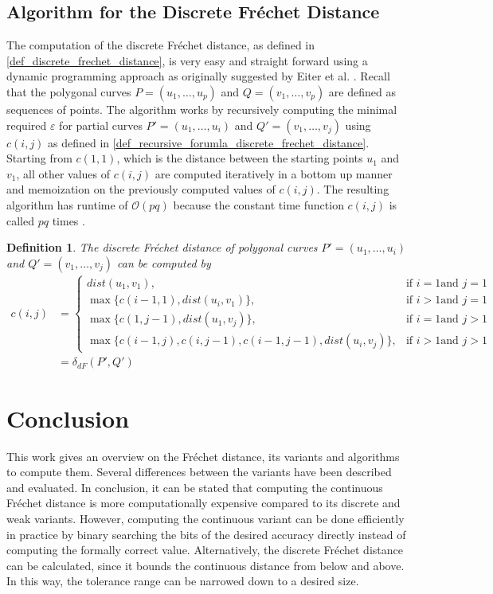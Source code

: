 \documentclass[
oneside,
fontsize=11pt
]{scrartcl}
\newtheorem{mydef}{Definition}
\begin{document}
\subsection{Algorithm for the Discrete Fréchet Distance}
\label{sec_discrete_algorithm}
The computation of the discrete Fréchet distance, as defined in \autoref{def_discrete_frechet_distance}, is very easy and straight forward 
using a dynamic programming approach as originally suggested by Eiter et al. \cite{eiter_computing_1994}.
Recall that the polygonal curves $P = (u_1, \dots, u_p)$ and $Q = (v_1, \dots, v_p)$ are defined as sequences of points.
The algorithm works by recursively computing the minimal required $\varepsilon$ for partial curves 
$P' = (u_1, \dots, u_i)$ and $Q' = (v_1, \dots, v_j)$
using $c(i,j)$ as defined in \autoref{def_recursive_forumla_discrete_frechet_distance}.
Starting from $c(1,1)$, which is the distance between the starting points $u_1$ and $v_1$,
all other values of $c(i,j)$ are computed iteratively in a bottom up manner 
and memoization on the previously computed values of $c(i,j)$.
The resulting algorithm has runtime of $\mathcal{O}(pq)$
because the constant time function $c(i,j)$ is called $pq$ times \cite{eiter_computing_1994}.

\begin{mydef}
  \label{def_recursive_forumla_discrete_frechet_distance}
  The discrete Fréchet distance of polygonal curves $P' = (u_1, \dots, u_i)$ and $Q' = (v_1, \dots, v_j)$
  can be computed by
  \begin{align*}
    c(i,j) &= \begin{cases}
      dist(u_1, v_1), &\text{if } i=1 \text{and } j=1 \\
      \max \{c(i-1,1), dist(u_i, v_1)\}, &\text{if } i>1 \text{and } j=1 \\
      \max \{c(1,j-1), dist(u_1, v_j)\}, &\text{if } i=1 \text{and } j>1 \\
      \max \{c(i-1,j), c(i,j-1), c(i-1,j-1), dist(u_i, v_j)\}, &\text{if } i>1 \text{and } j>1
    \end{cases} \\
    &= \delta_{dF}(P',Q')
  \end{align*}
\end{mydef}

\section{Conclusion}
This work gives an overview on the Fréchet distance, 
its variants and algorithms to compute them. 
Several differences between the variants have been described 
and evaluated. 
In conclusion, it can be stated that computing the continuous 
Fréchet distance is more computationally expensive compared 
to its discrete and weak variants.
However, computing the continuous variant can be done efficiently
in practice by binary searching the bits of the desired accuracy directly
instead of computing the formally correct value. 
Alternatively, the discrete Fréchet distance can be calculated, 
since it bounds the continuous distance 
from below and above. 
In this way, the tolerance range can be narrowed down to a desired size.
\end{document}
